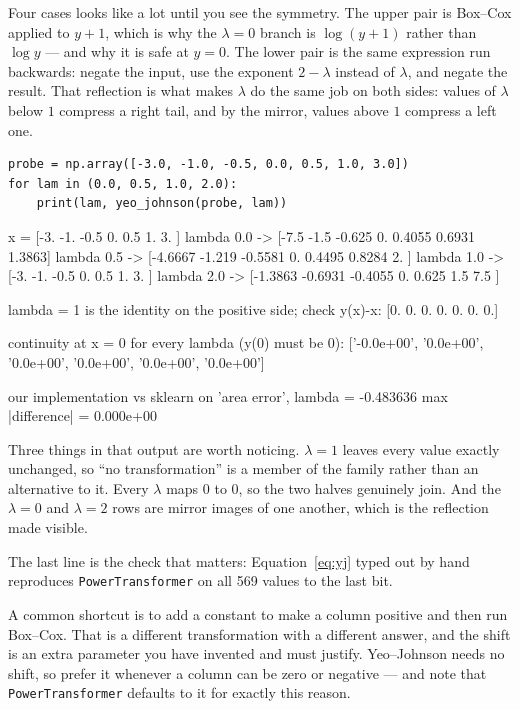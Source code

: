 \documentclass[11pt]{article}
\begin{document}
Four cases looks like a lot until you see the symmetry. The upper pair is
Box--Cox applied to $y + 1$, which is why the $\lambda = 0$ branch is
$\log(y+1)$ rather than $\log y$ --- and why it is safe at $y = 0$. The lower
pair is the same expression run backwards: negate the input, use the exponent
$2 - \lambda$ instead of $\lambda$, and negate the result. That reflection is
what makes $\lambda$ do the same job on both sides: values of $\lambda$ below
$1$ compress a right tail, and by the mirror, values above $1$ compress a left
one.

\begin{lstlisting}
probe = np.array([-3.0, -1.0, -0.5, 0.0, 0.5, 1.0, 3.0])
for lam in (0.0, 0.5, 1.0, 2.0):
    print(lam, yeo_johnson(probe, lam))
\end{lstlisting}
\begin{codeout}
x = [-3.  -1.  -0.5  0.   0.5  1.   3. ]
  lambda 0.0 -> [-7.5    -1.5    -0.625   0.      0.4055  0.6931  1.3863]
  lambda 0.5 -> [-4.6667 -1.219  -0.5581  0.      0.4495  0.8284  2.    ]
  lambda 1.0 -> [-3.  -1.  -0.5  0.   0.5  1.   3. ]
  lambda 2.0 -> [-1.3863 -0.6931 -0.4055  0.      0.625   1.5     7.5   ]

lambda = 1 is the identity on the positive side; check y(x)-x:
  [0. 0. 0. 0. 0. 0. 0.]

continuity at x = 0 for every lambda (y(0) must be 0):
  ['-0.0e+00', '0.0e+00', '0.0e+00', '0.0e+00', '0.0e+00', '0.0e+00']

our implementation vs sklearn on 'area error', lambda = -0.483636
  max |difference| = 0.000e+00
\end{codeout}

Three things in that output are worth noticing. $\lambda = 1$ leaves every
value exactly unchanged, so ``no transformation'' is a member of the family
rather than an alternative to it. Every $\lambda$ maps $0$ to $0$, so the two
halves genuinely join. And the $\lambda = 0$ and $\lambda = 2$ rows are mirror
images of one another, which is the reflection made visible.

The last line is the check that matters: Equation~\eqref{eq:yj} typed out by
hand reproduces \texttt{PowerTransformer} on all 569 values to the last bit.

\begin{caution}
A common shortcut is to add a constant to make a column positive and then run
Box--Cox. That is a different transformation with a different answer, and the
shift is an extra parameter you have invented and must justify. Yeo--Johnson
needs no shift, so prefer it whenever a column can be zero or negative --- and
note that \texttt{PowerTransformer} defaults to it for exactly this reason.
\end{caution}
\end{document}
